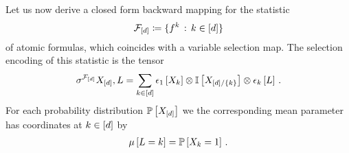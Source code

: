 Let us now derive a closed form backward mapping for the statistic
\begin{align*}
    \mathcal{F}_{[d]} \coloneqq \{f^{k} \,:\, k\in[d]\}
\end{align*}
of atomic formulas, which coincides with a variable selection map.
The selection encoding of this statistic is the tensor
\begin{align*}
    \sigma^{\mathcal{F}_{[d]}}{X_{[d]},L}
    = \sum_{k\in[d]} \epsilon_{1}\left[X_{k}\right] \otimes \mathbb{I}\left[X_{[d]/\{k\}}\right] \otimes \epsilon_{k}\left[L\right] \, .
\end{align*}
For each probability distribution $\mathbb{P}\left[X_{[d]}\right]$ we the corresponding mean parameter has coordinates at $k\in[d]$ by
\begin{align*}
    \mu\left[L=k\right] = \mathbb{P}\left[X_{k}=1\right]  \, .
\end{align*}

